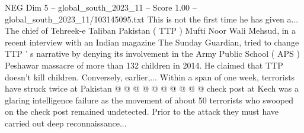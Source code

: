 \begin{textsample}{NEG Dim 5 – global\_south\_2023\_11 – Score 1.00 – global\_south\_2023\_11/103145095.txt}
This is not the first time he has given a...
The chief of Tehreek-e Taliban Pakistan ( TTP ) Mufti Noor Wali Mehsud, in a recent interview with an Indian magazine The Sunday Guardian, tried to change TTP ' s narrative by denying its involvement in the Army Public School ( APS ) Peshawar massacre of more than 132 children in 2014.
He claimed that TTP doesn't kill children.
Conversely, earlier,...
Within a span of one week, terrorists have struck twice at Pakistan @ @ @ @ @ @ @ @ @ @ check post at Kech was a glaring intelligence failure as the movement of about 50 terrorists who swooped on the check post remained undetected.
Prior to the attack they must have carried out deep reconnaissance...

\end{textsample}
